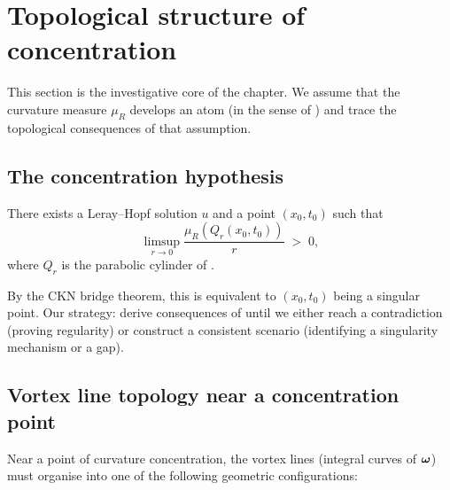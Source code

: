 \section{Topological structure of concentration}\label{sec:det-concentration}

This section is the investigative core of the chapter.  We assume that the
curvature measure $\mu_R$ develops an atom (in the sense of )
and trace the topological consequences of that assumption.

\subsection{The concentration hypothesis}\label{sec:det-hypothesis}

\begin{assumption}[Concentration]\label{ass:concentration}
  There exists a Leray--Hopf solution $u$ and a point $(x_0, t_0)$ such that
  \begin{equation}\label{eq:concentration-hypothesis}
    \limsup_{r\to 0} \frac{\mu_R(Q_r(x_0,t_0))}{r} \;>\; 0,
  \end{equation}
  where $Q_r$ is the parabolic cylinder of .
\end{assumption}

By the CKN bridge theorem, this is equivalent to $(x_0, t_0)$ being a singular
point.  Our strategy: derive consequences of  until we
either reach a contradiction (proving regularity) or construct a consistent
scenario (identifying a singularity mechanism or a gap).

\subsection{Vortex line topology near a concentration point}\label{sec:det-vortex-topology}

Near a point of curvature concentration, the vortex lines (integral curves of
$\boldsymbol{\omega}$) must organise into one of the following geometric configurations:

